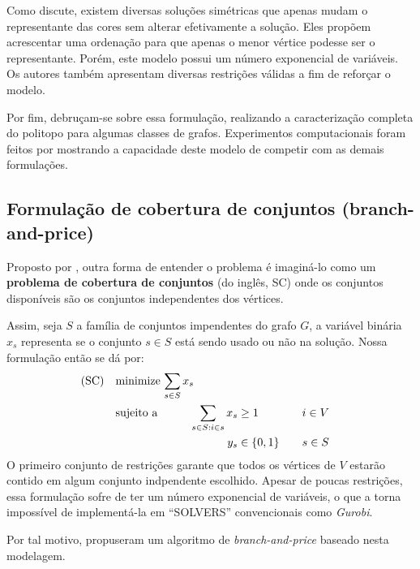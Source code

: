 \documentclass[11pt]{article}
\begin{document}
Como \textcite{Campelo2008AsymmetricRepresentativesFormulation} discute, existem diversas soluções simétricas que apenas mudam o representante das cores sem alterar efetivamente a solução.
Eles propõem acrescentar uma ordenação para que apenas o menor vértice podesse ser o representante.
Porém, este modelo possui um número exponencial de variáveis.
Os autores também apresentam diversas restrições válidas a fim de reforçar o modelo.

Por fim, \textcite{Campelo2008AsymmetricRepresentativesFormulation} debruçam-se sobre essa formulação, realizando a caracterização completa do politopo para algumas classes de grafos.
Experimentos computacionais foram feitos por \textcite{Jabrayilov2018NewIntegerLinear} mostrando a capacidade deste modelo de competir com as demais formulações.
\subsection{Formulação de cobertura de conjuntos (branch-and-price)}
\label{sec:org8e047b0}
Proposto por \textcite{Mehrotra1996ColumnGenerationApproach}, outra forma de entender o problema é imaginá-lo como um \textbf{problema de cobertura de conjuntos} (do inglês, SC) onde os conjuntos disponíveis são os conjuntos independentes dos vértices.

Assim, seja \(S\) a família de conjuntos impendentes do grafo \(G\), a variável binária \(x_s\) representa se o conjunto \(s \in S\) está sendo usado ou não na solução. Nossa formulação então se dá por:
\begin{alignat}{4}
\mathrm{(SC)} \quad & \omit\rlap{minimize  $\displaystyle \sum_{s \in S} x_s$} \nonumber \\
& \mbox{sujeito a}&& \quad & \sum_{s \in S: i \in s} x_{s}&\geq 1 & \quad & i \in V \label{rest9} \\
&                 &&   & y_s       & \in \{0,1\} &    & s \in S \nonumber
\end{alignat}
O primeiro conjunto de restrições garante que todos os vértices de \(V\) estarão contido em algum conjunto indpendente escolhido.
Apesar de poucas restrições, essa formulação sofre de ter um número exponencial de variáveis, o que a torna impossível de implementá-la em ``SOLVERS'' convencionais como \emph{Gurobi}.

Por tal motivo, \textcite{Mehrotra1996ColumnGenerationApproach} propuseram um algoritmo de \emph{branch-and-price}  baseado nesta modelagem.
\end{document}
